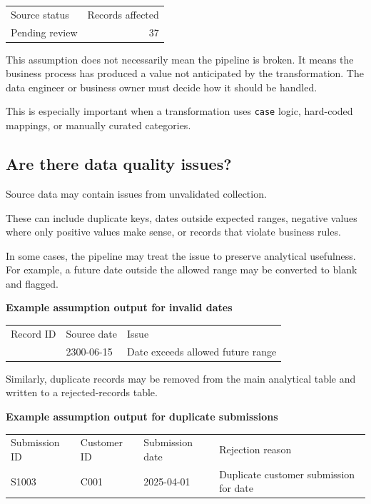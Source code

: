 \documentclass[10pt,openany,10pt]{book}
\newcounter{none}
\let\podeToprule\toprule
\let\podeMidrule\midrule
\let\podeBottomrule\bottomrule
\renewcommand{\toprule}{\arrayrulecolor{pbiGrid}\podeToprule}
\renewcommand{\midrule}{\arrayrulecolor{pbiGrid}\podeMidrule}
\renewcommand{\bottomrule}{\arrayrulecolor{pbiGrid}\podeBottomrule}
\begin{document}
{\def\LTcaptype{none} %
\begin{longtable}[]{@{}lr@{}}
\toprule\noalign{}
Source status & Records affected \\
\midrule\noalign{}
\endhead
\bottomrule\noalign{}
\endlastfoot
Pending review & 37 \\
\end{longtable}
}

This assumption does not necessarily mean the pipeline is broken. It
means the business process has produced a value not anticipated by the
transformation. The data engineer or business owner must decide how it
should be handled.

This is especially important when a transformation uses \texttt{case}
logic, hard-coded mappings, or manually curated categories.

\subsection{Are there data quality
issues?}\label{are-there-data-quality-issues}

Source data may contain issues from unvalidated collection.

These can include duplicate keys, dates outside expected ranges,
negative values where only positive values make sense, or records that
violate business rules.

In some cases, the pipeline may treat the issue to preserve analytical
usefulness. For example, a future date outside the allowed range may be
converted to blank and flagged.

\textbf{Example assumption output for invalid dates}

{\def\LTcaptype{none} %
\begin{longtable}[]{@{}rll@{}}
\toprule\noalign{}
Record ID & Source date & Issue \\
\midrule\noalign{}
\endhead
\bottomrule\noalign{}
\endlastfoot
2 & 2300-06-15 & Date exceeds allowed future range \\
\end{longtable}
}

Similarly, duplicate records may be removed from the main analytical
table and written to a rejected-records table.

\textbf{Example assumption output for duplicate submissions}

{\def\LTcaptype{none} %
\begin{longtable}[]{@{}llll@{}}
\toprule\noalign{}
Submission ID & Customer ID & Submission date & Rejection reason \\
\midrule\noalign{}
\endhead
\bottomrule\noalign{}
\endlastfoot
S1003 & C001 & 2025-04-01 & Duplicate customer submission for date \\
\end{longtable}
}
\end{document}

